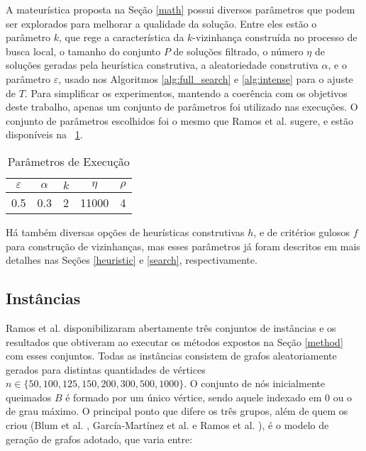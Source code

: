 \documentclass{MO824}
\begin{document}
    A mateurística proposta na Seção \ref{math} possui diversos parâmetros que podem ser explorados para melhorar a qualidade da solução. Entre eles estão o parâmetro $k$, que rege a característica da $k$-vizinhança construída no processo de busca local, o tamanho do conjunto $P$ de soluções filtrado, o número $\eta$ de soluções geradas pela heurística construtiva, a aleatoriedade construtiva $\alpha$, e o parâmetro $\varepsilon$, usado nos Algoritmos \ref{alg:full_search} e \ref{alg:intense} para o ajuste de $T$. Para simplificar os experimentos, mantendo a coerência com os objetivos deste trabalho, apenas um conjunto de parâmetros foi utilizado nas execuções. O conjunto de parâmetros escolhidos foi o mesmo que Ramos et al. \cite{natanael} sugere, e estão disponíveis na \tablename~\ref{tab:parameters}.
    
    \begin{table}[ht]
        \centering
        \begin{tabular}{|c|c|c|c|c|}
            \hline
             $\varepsilon$ & $\alpha$ & $k$ & $\eta$ & $\rho$ \\
             \hline
             0.5 & 0.3 & 2 & 11000 & 4\\
             \hline
        \end{tabular}
        \caption{Parâmetros de Execução}
        \label{tab:parameters}
    \end{table}

    Há também diversas opções de heurísticas construtivas $h$, e de critérios gulosos $f$ para construção de vizinhanças, mas esses parâmetros já foram descritos em mais detalhes nas Seções \ref{heuristic} e \ref{search}, respectivamente.
    
    \subsection{Instâncias} \label{instances}
    Ramos et al. \cite{ffp-instances-page} disponibilizaram abertamente três conjuntos de instâncias e os resultados que obtiveram ao executar os métodos expostos na Seção \ref{method} com esses conjuntos. Todas as instâncias consistem de grafos aleatoriamente gerados para distintas quantidades de vértices $n \in \{50, 100, 125, 150, 200, 300, 500, 1000\}$. O conjunto de nós inicialmente queimados $B$ é formado por um único vértice, sendo aquele indexado em $0$ ou o de grau máximo. O principal ponto que difere os três grupos, além de quem os criou (Blum et al. \cite{blum}, García‐Martínez et al. \cite{garcia} e Ramos et al. \cite{natanael}), é o modelo de geração de grafos adotado, que varia entre:
    
\end{document}

